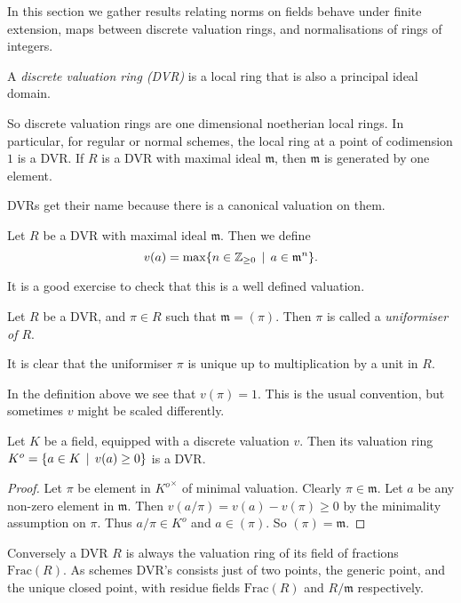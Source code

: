 In this section we gather results relating norms on fields behave under finite extension, maps between discrete valuation rings, and normalisations of rings of integers. 

\begin{definition}
	A \emph{discrete valuation ring (DVR)} is a local ring that is also a principal ideal domain. 
\end{definition}
So discrete valuation rings are one dimensional noetherian local rings. 
In particular, for regular or normal schemes, the local ring at a point of codimension $1$ is a DVR.
If $R$ is a DVR with maximal ideal $\mathfrak{m} $, then $\mathfrak{m} $ is generated by one element. 

DVRs get their name because there is a canonical valuation on them. 
\begin{definition}
	Let $R$ be a DVR with maximal ideal $\mathfrak{m}$. 
	Then we define \[
		v(a) = \max \{n \in \Z_{\ge 0 } \st a \in \mathfrak{m} ^{n} \} 
	.\] 
\end{definition}
It is a good exercise to check that this is a well defined valuation. 
\begin{definition}
	Let $R$ be a DVR, and $\pi \in R$ such that $\mathfrak{m}  = (\pi)$. 
	Then $\pi$ is called a \emph{uniformiser of $R$}. 
\end{definition}
It is clear that the uniformiser $\pi$ is unique up to multiplication by a unit in $R$. 
\begin{remark}
	In the definition above we see that $v(\pi) = 1$. 
	This is the usual convention, but sometimes $v$ might be scaled differently. 
\end{remark}

\begin{lemma}
	Let $K$ be a field, equipped with a discrete valuation $v$. 
	Then its valuation ring $K^{o} = \{a \in K\st v(a) \ge 0\} $ is a DVR. 
\end{lemma}
\begin{proof}
	Let $\pi$ be element in ${K^{o}}^{\times }$ of minimal valuation. 
	Clearly $\pi \in \mathfrak{m} $. 
	Let $a$ be any non-zero element in $\mathfrak{m} $. 
	Then $v(a/ \pi) = v(a) - v(\pi) \ge 0$ by the minimality assumption on $\pi$. 
	Thus $a / \pi \in K^{o}$ and $a \in (\pi)$. 
	So $(\pi) = \mathfrak{m} $. 
\end{proof}

Conversely a DVR  $R$ is always the valuation ring of its field of fractions $\mathrm{Frac}(R)$. 
As schemes DVR's consists just of two points, the generic point, and the unique closed point, with residue fields $\mathrm{Frac}(R)$ and $R / \mathfrak{m} $ respectively. 

